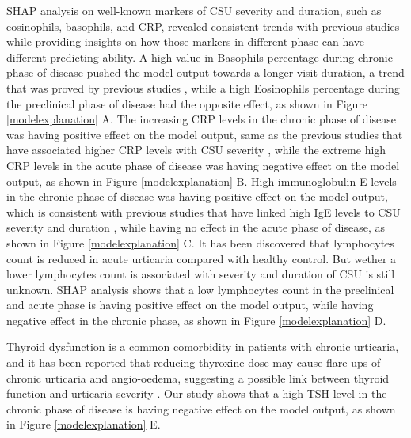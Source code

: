 \documentclass[final,3p,times,authoryear]{elsarticle}
\begin{document}
SHAP analysis on well-known markers of CSU severity and duration, such as eosinophils, basophils, and CRP, revealed consistent trends with previous studies while providing insights on how those markers in different phase can have different predicting ability. 
A high value in Basophils percentage during chronic phase of disease pushed the model output towards a longer visit duration, a trend that was proved by previous studies \citep{SanchezBorges2017Factors}, while a high Eosinophils percentage during the preclinical phase of disease had the opposite effect, as shown in Figure \ref{modelexplanation} A.
The increasing CRP levels in the chronic phase of disease was having positive effect on the model output, same as the previous studies that have associated higher CRP levels with CSU severity \citep{Rabelo-Filardi2013Parameters}, while the extreme high CRP levels in the acute phase of disease was having negative effect on the model output, as shown in Figure \ref{modelexplanation} B. 
High immunoglobulin E levels in the chronic phase of disease was having positive effect on the model output, which is consistent with previous studies that have linked high IgE levels to CSU severity and duration \citep{SanchezBorges2017Factors}, while having no effect in the acute phase of disease, as shown in Figure \ref{modelexplanation} C.
It has been discovered that lymphocytes count is reduced in acute urticaria compared with healthy control. But wether a lower lymphocytes count is associated with severity and duration of CSU is still unknown. SHAP analysis shows that a low lymphocytes count in the preclinical and acute phase is having positive effect on the model output, while having negative effect in the chronic phase, as shown in Figure \ref{modelexplanation} D.

Thyroid dysfunction is a common comorbidity in patients with chronic urticaria, and it has been reported that reducing thyroxine dose may cause flare-ups of chronic urticaria and angio-oedema, suggesting a possible link between thyroid function and urticaria severity \citep{Dunkley2003Thyroid}. Our study shows that a high TSH level in the chronic phase of disease is having negative effect on the model output, as shown in Figure \ref{modelexplanation} E.
\end{document}
